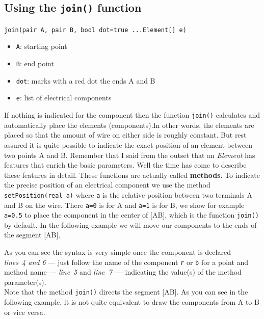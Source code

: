 \documentclass[10pt]{article}
\begin{document}
\subsection{Using the \texttt{join()} function}
\begin{center}
\verb|join(pair A, pair B, bool dot=true ...Element[] e)|
\end{center}
\begin{itemize}
\item \verb|A|: starting point
\item \verb|B|: end point
\item \verb|dot|: marks with a red dot the ends A and B
\item \verb|e|: list of electrical components
\end{itemize}
\bigskip
If nothing is indicated for the component then the function \verb|join()| calculates and automatically place the elements (components).In other words, the elements are placed so that the amount of wire on either side is roughly constant. But rest assured it is quite possible to indicate the exact position of an element between two points A and B. Remember that I said from the outset that an \emph{Element} has features that enrich the basic parameters. Well the time has come to describe these features in detail. These functions are actually called \textbf{methods}. To indicate the precise position of an electrical component we use the method \verb|setPosition(real a)| where \verb|a| is the relative position between two terminals A and B on the wire. There \verb|a=0| is for A and \verb|a=1| is for B, we show for example \verb|a=0.5| to place the component in the center of [AB], which is the function \verb|join()| by default. In the following example we will move our components to the ends of the segment [AB]. 


As you can see the syntax is very simple once the component is declared --- \emph{lines~4 and 6} --- just follow the name of the component \verb|r| or \verb|b| for a point and method name --- \emph{line~5} and \emph{line~7}~--- indicating the value(s) of the method parameter(s).\\
Note that the method \verb|join()| directs the segment [AB]. As you can see in the following example, it is not quite equivalent to draw the components from A to B or vice versa.

\end{document}
